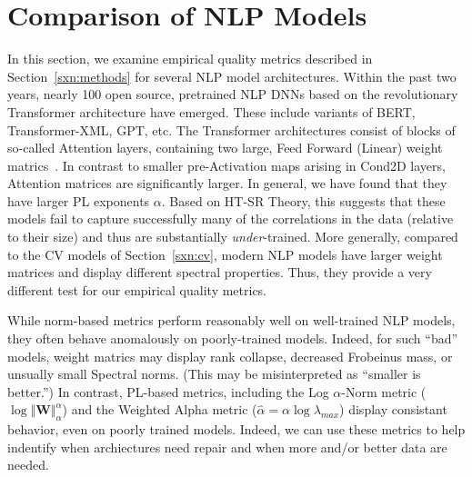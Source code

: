\section{Comparison of NLP Models}
\label{sxn:nlp}

In this section, we examine empirical quality metrics described in Section~\ref{sxn:methods} for several NLP model architectures.
%
Within the past two years, nearly 100 open source, pretrained NLP DNNs based on the revolutionary Transformer architecture have emerged.
These include variants of BERT, Transformer-XML, GPT, etc.
%
The Transformer architectures consist of blocks of so-called Attention layers, containing two large, Feed Forward (Linear) weight matrics~\cite{Attn2017}. 
In contrast to smaller pre-Activation maps arising in Cond2D layers, Attention matrices are significantly larger.
In general, we have found that they have larger PL exponents $\alpha$.
Based on HT-SR Theory, 
this suggests that these models fail to capture successfully many of the correlations in the data (relative to their size) and thus are substantially \emph{under}-trained.
%
More generally, compared to the CV models of Section~\ref{sxn:cv},
modern NLP models have larger weight matrices and display different spectral properties.
Thus, they provide a very different test for our empirical quality metrics.

While norm-based metrics perform reasonably well on well-trained NLP models, they often behave anomalously on poorly-trained models.
Indeed, for such ``bad'' models, weight matrics may display rank collapse, decreased Frobeinus mass, or unsually small Spectral norms.
(This may be misinterpreted as ``smaller is better.'')
In contrast, PL-based metrics, including the Log $\alpha$-Norm metric ($\log\Vert\mathbf{W}\Vert_{\alpha}^{\alpha}$) and the Weighted Alpha metric ($\hat\alpha =\alpha\log\lambda_{max} $) display consistant behavior, even on poorly trained models.
Indeed, we can use these metrics to help indentify when archiectures need repair and when more and/or better data are needed.


